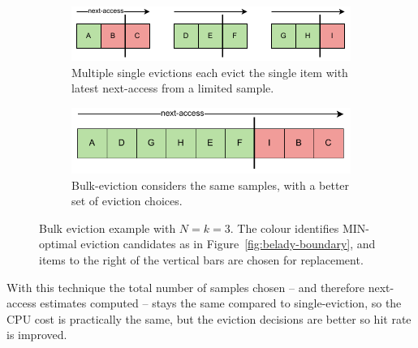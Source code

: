 \begin{figure}
    \centering
    \begin{subfigure}{\columnwidth}
        \centering
        \includegraphics[width=\columnwidth]{figures/Diagrams/diagrams-multi-eviction-a.pdf}
        \caption{Multiple single evictions each evict the single item with latest next-access from a limited sample.}
    \end{subfigure}
    \vspace{5pt}
    \begin{subfigure}{\columnwidth}
        \centering
        \includegraphics[width=0.8181818\columnwidth]{figures/Diagrams/diagrams-multi-eviction-b.pdf}
        \caption{Bulk-eviction considers the same samples, with a better set of eviction choices.}
    \end{subfigure}
    
    \caption[Bulk eviction example]{Bulk eviction example with $N=k=3$. The colour identifies MIN-optimal eviction candidates as in Figure~\ref{fig:belady-boundary}, and items to the right of the vertical bars are chosen for replacement.}
    \label{fig:multi-eviction}
\end{figure}

With this technique the total number of samples chosen -- and therefore next-access estimates computed -- stays the same compared to single-eviction, so the CPU cost is practically the same, but the eviction decisions are better so hit rate is improved.





